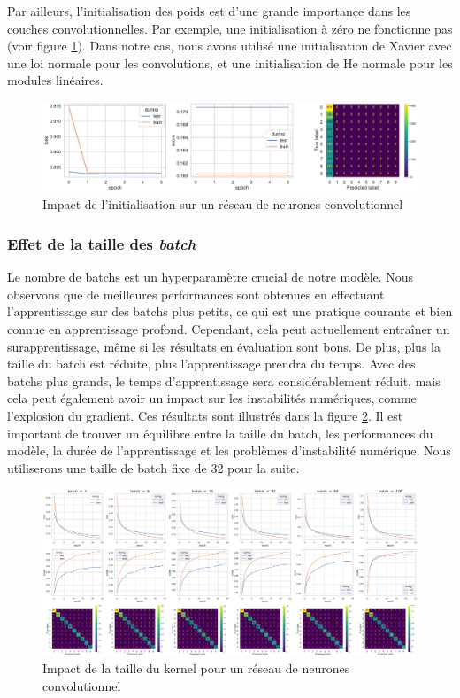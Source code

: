 \documentclass{article}
\begin{document}
Par ailleurs, l'initialisation des poids est d'une grande importance dans les couches convolutionnelles. Par exemple, une initialisation à zéro ne fonctionne pas (voir figure \ref{fig:convinit}). Dans notre cas, nous avons utilisé une initialisation de Xavier avec une loi normale pour les convolutions, et une initialisation de He normale pour les modules linéaires.

\begin{figure}[htbp]
    \centering
    \includegraphics[width=\textwidth]{conv/conv_32batch_zeros.pdf}
    \caption{Impact de l'initialisation sur un réseau de neurones convolutionnel}
    \label{fig:convinit}
\end{figure}


\subsubsection{Effet de la taille des \textit{batch}}

Le nombre de batchs est un hyperparamètre crucial de notre modèle. Nous observons que de meilleures performances sont obtenues en effectuant l'apprentissage sur des batchs plus petits, ce qui est une pratique courante et bien connue en apprentissage profond. Cependant, cela peut actuellement entraîner un surapprentissage, même si les résultats en évaluation sont bons. De plus, plus la taille du batch est réduite, plus l'apprentissage prendra du temps. Avec des batchs plus grands, le temps d'apprentissage sera considérablement réduit, mais cela peut également avoir un impact sur les instabilités numériques, comme l'explosion du gradient. Ces résultats sont illustrés dans la figure \ref{fig:conv_batch}. Il est important de trouver un équilibre entre la taille du batch, les performances du modèle, la durée de l'apprentissage et les problèmes d'instabilité numérique. Nous utiliserons une taille de batch fixe de 32 pour la suite.


\begin{figure}[htbp]
    \centering
    \includegraphics[width=\textwidth]{conv/conv_batch.pdf}
    \caption{Impact de la taille du kernel pour un réseau de neurones convolutionnel}
    \label{fig:conv_batch}
\end{figure}
\end{document}
